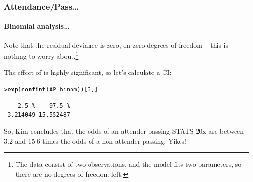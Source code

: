 \documentclass{beamer}\usepackage[]{graphicx}\usepackage[]{xcolor}
\makeatletter
\newcommand{\hlnum}[1]{\textcolor[rgb]{0.686,0.059,0.569}{#1}}%
\newcommand{\hlstd}[1]{\textcolor[rgb]{0.345,0.345,0.345}{#1}}%
\newcommand{\hlkwd}[1]{\textcolor[rgb]{0.737,0.353,0.396}{\textbf{#1}}}%
\newenvironment{kframe}{%
 \def\at@end@of@kframe{}%
 \ifinner\ifhmode%
  \def\at@end@of@kframe{\end{minipage}}%
  \begin{minipage}{\columnwidth}%
 \fi\fi%
 \def\FrameCommand##1{\hskip\@totalleftmargin \hskip-\fboxsep
 \colorbox{shadecolor}{##1}\hskip-\fboxsep
     \hskip-\linewidth \hskip-\@totalleftmargin \hskip\columnwidth}%
 \MakeFramed {\advance\hsize-\width
   \@totalleftmargin\z@ \linewidth\hsize
   \@setminipage}}%
 {\par\unskip\endMakeFramed%
 \at@end@of@kframe}
\newenvironment{knitrout}{}{} %
\makeatother
\begin{document}
\begin{frame}[fragile]
\frametitle{Attendance/Pass\ldots}
\framesubtitle{Binomial analysis\ldots}

Note that the residual deviance is zero, on zero degrees of freedom -- this is nothing to worry about.\footnote{The data consist of two observations, and the model fits two parameters, so there are no degrees of freedom left.}
\bigskip

The effect of  is highly significant, so let's calculate a CI:

\begin{knitrout}\scriptsize
{}\color{fgcolor}\begin{kframe}
\begin{alltt}
\hlstd{> }\hlkwd{exp}\hlstd{(}\hlkwd{confint}\hlstd{(AP.binom))[}\hlnum{2}\hlstd{,]}
\end{alltt}


{\ttfamily\noindent\itshape\color{messagecolor}{Waiting for profiling to be done...}}\begin{verbatim}
    2.5 %    97.5 % 
 3.214049 15.552487 
\end{verbatim}
\end{kframe}
\end{knitrout}
\bigskip

So, Kim concludes that the odds of an attender passing STATS 20x are between 3.2 and 15.6 times the odds of a non-attender passing. Yikes!
\end{frame}


\end{document}
